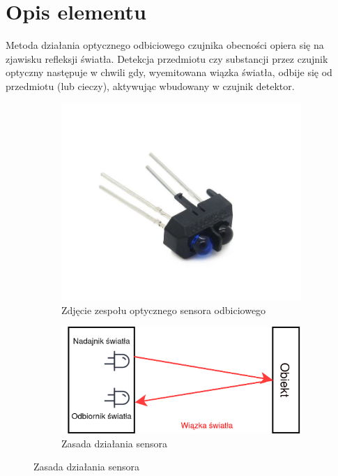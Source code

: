 \documentclass[11pt, a4paper]{article}
\author{Patryk Kościk}
\begin{document}
%
%
\newpage

\section*{Opis elementu}
Metoda działania optycznego odbiciowego czujnika obecności opiera się na zjawisku refleksji światła. Detekcja przedmiotu czy substancji przez czujnik optyczny następuje w chwili gdy, wyemitowana wiązka światła, odbije się od przedmiotu (lub cieczy), aktywując wbudowany w czujnik detektor.



\vspace{0.25cm}
\begin{figure}[h]
\centering
\begin{subfigure}{.5\textwidth}
\centering
\includegraphics[width=.7\linewidth]{fig/SCOO/odb.png}
\caption{Zdjęcie zespołu optycznego sensora odbiciowego}
\label{fig:_zdjecie_elementu}
\end{subfigure}%
\begin{subfigure}{.5\textwidth}
\centering
\includegraphics[width=.7\linewidth]{fig/SCOO/zasd.png}
\caption{Zasada działania sensora}
\label{fig:_zasada_dzialania_elementu}
\end{subfigure}
\label{fig:element}
\end{figure}
\vspace{0.25cm}
\end{document}
